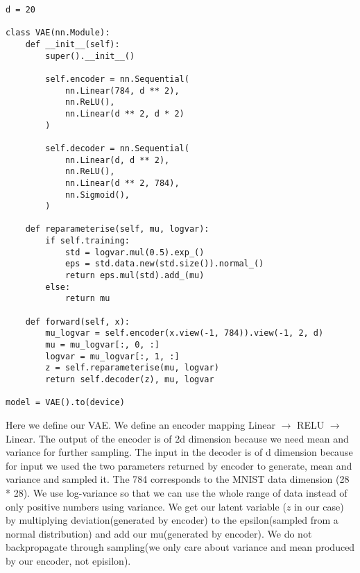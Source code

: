 \begin{verbatim}
d = 20

class VAE(nn.Module):
    def __init__(self):
        super().__init__()

        self.encoder = nn.Sequential(
            nn.Linear(784, d ** 2),
            nn.ReLU(),
            nn.Linear(d ** 2, d * 2)
        )

        self.decoder = nn.Sequential(
            nn.Linear(d, d ** 2),
            nn.ReLU(),
            nn.Linear(d ** 2, 784),
            nn.Sigmoid(),
        )

    def reparameterise(self, mu, logvar):
        if self.training:
            std = logvar.mul(0.5).exp_()
            eps = std.data.new(std.size()).normal_()
            return eps.mul(std).add_(mu)
        else:
            return mu

    def forward(self, x):
        mu_logvar = self.encoder(x.view(-1, 784)).view(-1, 2, d)
        mu = mu_logvar[:, 0, :]
        logvar = mu_logvar[:, 1, :]
        z = self.reparameterise(mu, logvar)
        return self.decoder(z), mu, logvar

model = VAE().to(device)
\end{verbatim}

Here we define our VAE. We define an encoder mapping Linear $\rightarrow$ RELU $\rightarrow$ Linear.
The output of the encoder is of 2d dimension because we need mean and variance for further sampling. The input in the decoder is of d dimension because for input we used the two parameters returned by encoder to generate, mean and variance and sampled it. The 784 corresponds to the MNIST data dimension (28 * 28). We use log-variance so that we can use the whole range of data instead of only positive numbers using variance. We get our latent variable ($z$ in our case) by multiplying  deviation(generated by encoder) to the epsilon(sampled from a normal distribution) and add our mu(generated by encoder). We do not backpropagate through sampling(we only care about variance and mean produced by our encoder, not episilon).


